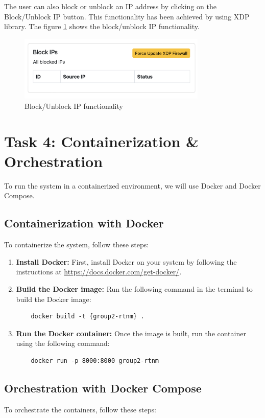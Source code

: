 The user can also block or unblock an IP address by clicking on the Block/Unblock IP button. This functionality has been achieved by using XDP library. The figure \ref{fig:block-unblock} shows the block/unblock IP functionality.
\begin{figure}[H]
    \centering
    \includegraphics[width=0.8\textwidth]{../images/block-unblock.png}
    \caption{Block/Unblock IP functionality}
    \label{fig:block-unblock}
\end{figure}


\section{Task 4: Containerization \& Orchestration}

To run the system in a containerized environment, we will use Docker and Docker Compose.
\subsection{Containerization with Docker}
To containerize the system, follow these steps:

\begin{enumerate}
    \item \textbf{Install Docker:} First, install Docker on your system by following the instructions at \url{https://docs.docker.com/get-docker/}.
    \item \textbf{Build the Docker image:} Run the following command in the terminal to build the Docker image:
    \begin{verbatim}
    docker build -t {group2-rtnm} .
    \end{verbatim}
    \item \textbf{Run the Docker container:} Once the image is built, run the container using the following command:
    \begin{verbatim}
    docker run -p 8000:8000 group2-rtnm
    \end{verbatim}
\end{enumerate}

\subsection{Orchestration with Docker Compose}
To orchestrate the containers, follow these steps:

